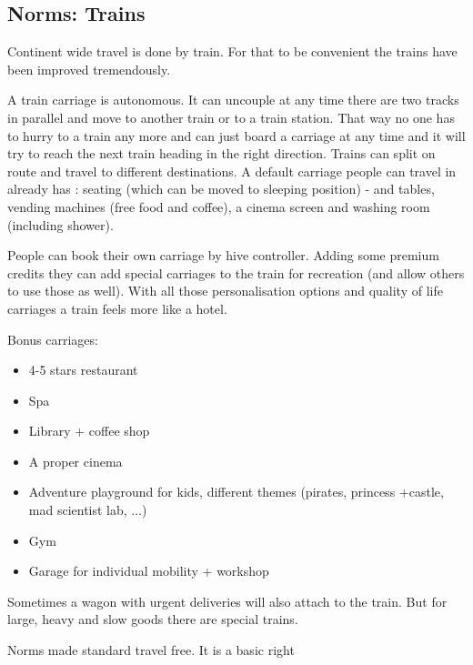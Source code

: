 \subsection{Norms: Trains}

Continent wide travel is done by train. For that to be convenient the trains have been improved tremendously.

A train carriage is autonomous. It can uncouple at any time there are two tracks in parallel and move to another train or to a train station. That way no one has to hurry to a train any more and can just board a carriage at any time and it will try to reach the next train heading in the right direction.
Trains can split on route and travel to different destinations.
A default carriage people can travel in already has : seating (which can be moved to sleeping position) - and tables, vending machines (free food and coffee), a cinema screen and washing room (including shower).

People can book their own carriage by hive controller. Adding some premium credits they can add special carriages to the train for recreation (and allow others to use those as well). With all those personalisation options and quality of life carriages a train feels more like a hotel.

Bonus carriages:

\begin{itemize}
    \item 4-5 stars restaurant
    \item Spa
    \item Library + coffee shop
    \item A proper cinema
    \item Adventure playground for kids, different themes (pirates, princess +castle, mad scientist lab, ...)
    \item Gym
    \item Garage for individual mobility + workshop
\end{itemize}

Sometimes a wagon with urgent deliveries will also attach to the train. But for large, heavy and slow goods there are special trains.

Norms made standard travel free. It is a basic right




